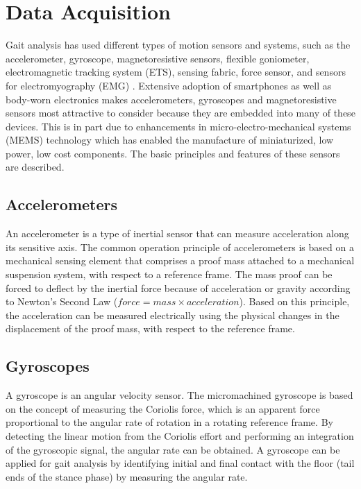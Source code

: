 \documentclass[11pt, oneside]{report}   	%
\begin{document}
\section{Data Acquisition}

Gait analysis has used different types of motion sensors and systems, such as the accelerometer, gyroscope, magnetoresistive sensors, flexible goniometer, electromagnetic tracking system (ETS), sensing fabric, force sensor, and sensors for electromyography (EMG) \cite{Tao2012}. Extensive adoption of smartphones as well as body-worn electronics makes accelerometers, gyroscopes and magnetoresistive sensors most attractive to consider because they are embedded into many of these devices. This is in part due to enhancements in micro-electro-mechanical systems (MEMS) technology which has enabled the manufacture of miniaturized, low power, low cost components\cite{SantAnna2009}. The basic principles and features of these sensors are described.

\subsection{Accelerometers}

An accelerometer is a type of inertial sensor that can measure acceleration along its sensitive axis\cite{Tao2012}. The common operation principle of accelerometers is based on a mechanical sensing element that comprises a proof mass attached to a mechanical suspension system, with respect to a reference frame\cite{Tao2012}. The mass proof can be forced to deflect by the inertial force because of acceleration or gravity according to Newton's Second Law ($force = mass \times acceleration$). Based on this principle, the acceleration can be measured electrically using the physical changes in the displacement of the proof mass, with respect to the reference frame\cite{Tao2012}.

\subsection{Gyroscopes}

A gyroscope is an angular velocity sensor. The micromachined gyroscope is based on the concept of measuring the Coriolis force, which is an apparent force proportional to the angular rate of rotation in a rotating reference frame\cite{Tao2012}. By detecting the linear motion from the Coriolis effort and performing an integration of the gyroscopic signal, the angular rate can be obtained\cite{Tao2012}. A gyroscope can be applied for gait analysis by identifying initial and final contact with the floor (tail ends of the stance phase) by measuring the angular rate\cite{Catalfamo2010}.
\end{document}

